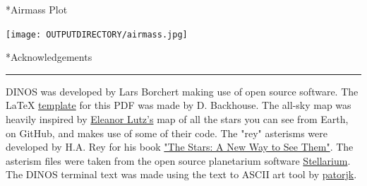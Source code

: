 \documentclass[12pt,preprintnumbers,amsmath,amssymb,nofootinbib,superscriptaddress]{revtex4-1}
\begin{document}
*{Airmass Plot}\label{Ueff}
\vspace{-0.2cm}

\begin{center}
    \texttt{[image: OUTPUTDIRECTORY/airmass.jpg]}
\end{center}


\newpage

*{Acknowledgements}
\vspace{-0.2cm}\hrule
\vspace{1cm}

DINOS was developed by Lars Borchert making use of open source software.
The LaTeX \href{https://www.overleaf.com/latex/templates/academic-presentation-template/jpgfpsstrwzd}{template} for this PDF was made by D. Backhouse.
The all-sky map was heavily inspired by \href{https://github.com/eleanorlutz/western_constellations_atlas_of_space}{Eleanor Lutz's} map of all the stars you can see from Earth, on GitHub, and makes use of some of their code.
The "rey" asterisms were developed by H.A. Rey for his book \href{https://en.wikipedia.org/wiki/The_Stars:_A_New_Way_to_See_Them}{"The Stars: A New Way to See Them"}.
The asterism files were taken from the open source planetarium software \href{https://stellarium.org/}{Stellarium}.
The DINOS terminal text was made using the text to ASCII art tool by \href{http://patorjk.com/software/taag/#p=display&f=Bi}{patorjk}.
\end{document}
